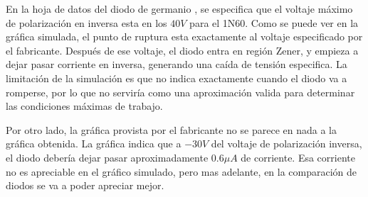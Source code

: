 \documentclass[chaptersright]{informeutn}
\begin{document}
        En la hoja de datos del diodo de germanio \cite{DS1}, se especifica que el voltaje máximo de polarización en
        inversa esta en los $40V$ para el 1N60. Como se puede ver en la gráfica simulada, el punto de ruptura esta
        exactamente al voltaje especificado por el fabricante. Después de ese voltaje, el diodo entra en región Zener,
        y empieza a dejar pasar corriente en inversa, generando una caída de tensión especifica. La limitación de la
        simulación es que no indica exactamente cuando el diodo va a romperse, por lo que no serviría como una
        aproximación valida para determinar las condiciones máximas de trabajo.

        Por otro lado, la gráfica provista por el fabricante no se parece en nada a la gráfica obtenida. La gráfica
        indica que a $-30V$ del voltaje de polarización inversa, el diodo debería dejar pasar aproximadamente
        $0.6\mu A$ de corriente. Esa corriente no es apreciable en el gráfico simulado, pero mas adelante, en la
        comparación de diodos se va a poder apreciar mejor.
\end{document}
